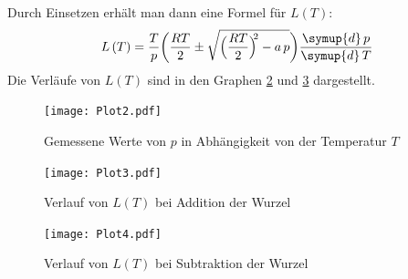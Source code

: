 \documentclass[
  bibliography=totoc,     %
  captions=tableheading,  %
  titlepage=firstiscover, %
]{scrartcl}
\begin{document}
Durch Einsetzen erhält man dann eine Formel für $L \left( T \right)$:
\begin{equation}
  L \left( T \right) = \frac{T}{p} \biggl( \frac{RT}{2} \pm \sqrt{\Bigl( \frac{RT}{2} \Bigr)^{\!\!2} - a \, p} \biggr) \frac{\symup{d}\,p}{\symup{d}\,T}
  \label{eqn:LT}
\end{equation}
Die Verläufe von $L \left( T \right)$ sind in den Graphen \ref{fig:plot3} und \ref{fig:plot4} dargestellt.
\begin{figure}
  \centering
  \texttt{[image: Plot2.pdf]}
  \caption{Gemessene Werte von $p$ in Abhängigkeit von der Temperatur $T$}
  \label{fig:plot2}
\end{figure}
\begin{figure}
  \centering
  \texttt{[image: Plot3.pdf]}
  \caption{Verlauf von $L \left( T \right)$ bei Addition der Wurzel}
  \label{fig:plot3}
\end{figure}
\begin{figure}
  \centering
  \texttt{[image: Plot4.pdf]}
  \caption{Verlauf von $L \left( T \right)$ bei Subtraktion der Wurzel}
  \label{fig:plot4}
\end{figure}
\newpage
\end{document}

